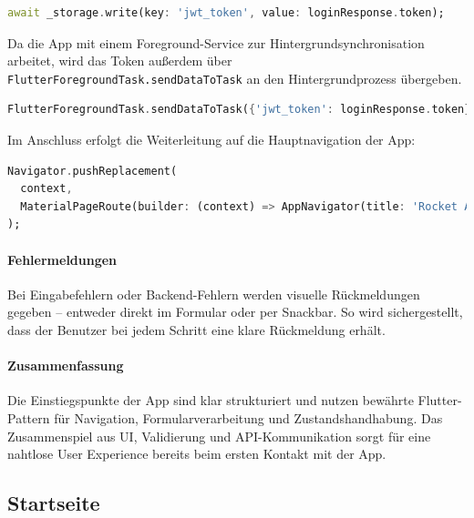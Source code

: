 \documentclass[11pt,a4paper]{article}
\begin{document}
\begin{lstlisting}[language=Dart, caption=Speichern des JWT nach Login]
await _storage.write(key: 'jwt_token', value: loginResponse.token);
\end{lstlisting}

Da die App mit einem Foreground-Service zur Hintergrundsynchronisation arbeitet, wird das Token außerdem über \texttt{FlutterForegroundTask.sendDataToTask} an den Hintergrundprozess übergeben.

\begin{lstlisting}[language=Dart, caption=Token an Hintergrundprozess senden]
FlutterForegroundTask.sendDataToTask({'jwt_token': loginResponse.token});
\end{lstlisting}

Im Anschluss erfolgt die Weiterleitung auf die Hauptnavigation der App:

\begin{lstlisting}[language=Dart, caption=Navigation zum App-Hauptmenü]
Navigator.pushReplacement(
  context,
  MaterialPageRoute(builder: (context) => AppNavigator(title: 'Rocket App')),
);
\end{lstlisting}

\paragraph{Fehlermeldungen}
Bei Eingabefehlern oder Backend-Fehlern werden visuelle Rückmeldungen gegeben – entweder direkt im Formular oder per Snackbar. So wird sichergestellt, dass der Benutzer bei jedem Schritt eine klare Rückmeldung erhält.

\paragraph{Zusammenfassung}
Die Einstiegspunkte der App sind klar strukturiert und nutzen bewährte Flutter-Pattern für Navigation, Formularverarbeitung und Zustandshandhabung. Das Zusammenspiel aus UI, Validierung und API-Kommunikation sorgt für eine nahtlose User Experience bereits beim ersten Kontakt mit der App.

\subsection{Startseite}
\end{document}
